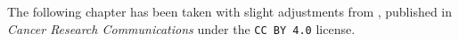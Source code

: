 


\setcounter{figure}{0}
\setcounter{table}{0}

%
\vspace{-\baselineskip}%
%


{\footnotesize \noindent The following chapter  has
    been taken with slight adjustments from
    \citet{kuricModelingMyelomaDissemination2024}, published in \textit{Cancer
        Research Communications} under the \texttt{CC BY 4.0} license.}

\vspace{-\vquarter}

